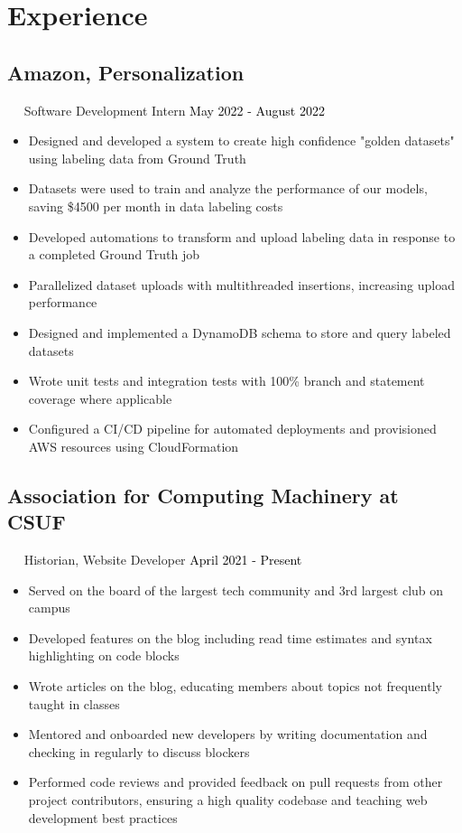 \documentclass{article}
\newcommand{\resumesection}[3]{
    \subsection*{#1}
    \ 
    \ 
    \small
    \textcolor{csufgrey}{#2}
    \normalsize
    \hfill
    \textcolor{black}{#3}
    \normalsize
}
\begin{document}
\section*{Experience}
\resumesection{Amazon, Personalization}{Software Development Intern}{May 2022 - August 2022}
\begin{itemize}
    \item Designed and developed a system to create high confidence "golden datasets" using labeling data from Ground Truth
    \item Datasets were used to train and analyze the performance of our models, saving \$4500 per month in data labeling costs
    \item Developed automations to transform and upload labeling data in response to a completed Ground Truth job
    \item Parallelized dataset uploads with multithreaded insertions, increasing upload performance
    \item Designed and implemented a DynamoDB schema to store and query labeled datasets
    \item Wrote unit tests and integration tests with 100\% branch and statement coverage where applicable
    \item Configured a CI/CD pipeline for automated deployments and provisioned AWS resources using CloudFormation
\end{itemize}
\resumesection{Association for Computing Machinery at CSUF}{Historian, Website Developer}{April 2021 - Present}
\begin{itemize}
    \item Served on the board of the largest tech community and 3rd largest club on campus
    \item Developed features on the blog including read time estimates and syntax highlighting on code blocks
    \item Wrote articles on the blog, educating members about topics not frequently taught in classes
    \item Mentored and onboarded new developers by writing documentation and checking in regularly to discuss blockers
    \item Performed code reviews and provided feedback on pull requests from other project contributors, ensuring a high quality codebase and teaching web development best practices
\end{itemize}
\end{document}
